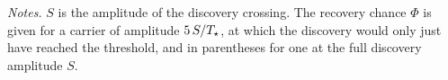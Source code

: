\begin{table}
\centering
\caption{\textbf{The field leader}, the crossing whose stellar statistic
exceeds all \NCtrl{} control positions of its own window
(\S\ref{sec:vistest}).}
\label{tab:cand}
\footnotesize

\par\vspace{2pt}
{\scriptsize \emph{Notes.} $S$ is the amplitude of the discovery crossing.
The recovery chance $\Phi$ is given for a carrier of amplitude $5\,S/T_\star$,
at which the discovery would only just have reached the threshold, and in
parentheses for one at the full discovery amplitude $S$.\par}
\end{table}
